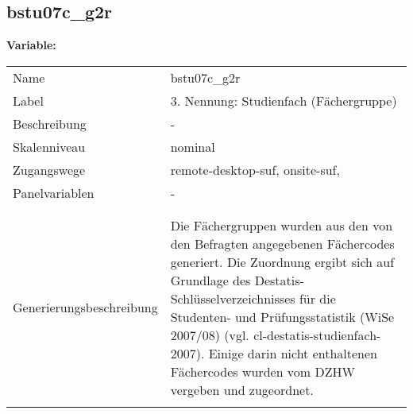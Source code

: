 	
	
	\subsection{bstu07c\_g2r}
	\label{subSection:bstu07c_g2r}

	\noindent\textbf{Variable:}\\
		\begin{tabular}{lL{11.3cm}}
			\label{tableVariable:bstu07c_g2r}
			Name & bstu07c\_g2r \\
			Label & 3. Nennung: Studienfach (Fächergruppe) \\
			Beschreibung & - \\
			Skalenniveau & nominal \\
			Zugangswege &
				remote-desktop-suf,
				onsite-suf,
 \\
			Panelvariablen & -
			 \\
			 \\
 \\
					Generierungsbeschreibung & Die Fächergruppen wurden aus den von den Befragten angegebenen Fächercodes generiert. Die Zuordnung ergibt sich auf Grundlage des Destatis-Schlüsselverzeichnisses für die Studenten- und Prüfungsstatistik (WiSe 2007/08) (vgl. cl-destatis-studienfach-2007).  Einige darin nicht enthaltenen Fächercodes wurden vom DZHW vergeben und zugeordnet. 
				 \\	
			 \\
		\end{tabular}






